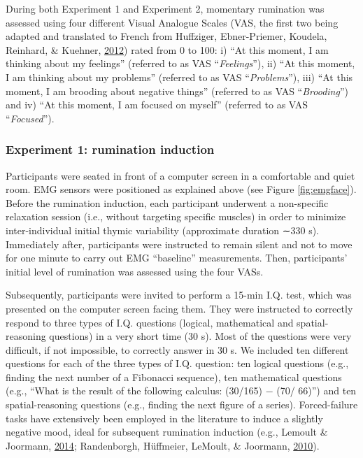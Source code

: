 \documentclass[a4paper,12pt,twoside,openright,oldfontcommands]{memoir}
\begin{document}
During both Experiment 1 and Experiment 2, momentary rumination was
assessed using four different Visual Analogue Scales (VAS, the first two
being adapted and translated to French from Huffziger, Ebner-Priemer,
Koudela, Reinhard, \& Kuehner,
\protect\hyperlink{ref-Huffziger2012}{2012}) rated from 0 to 100: i)
``At this moment, I am thinking about my feelings'' (referred to as VAS
``\emph{Feelings}''), ii) ``At this moment, I am thinking about my
problems'' (referred to as VAS ``\emph{Problems}''), iii) ``At this
moment, I am brooding about negative things'' (referred to as VAS
``\emph{Brooding}'') and iv) ``At this moment, I am focused on myself''
(referred to as VAS ``\emph{Focused}'').

\subsubsection{Experiment 1: rumination
induction}\label{experiment-1-rumination-induction}

Participants were seated in front of a computer screen in a comfortable
and quiet room. EMG sensors were positioned as explained above (see
Figure \ref{fig:emgface}). Before the rumination induction, each
participant underwent a non-specific relaxation session (i.e., without
targeting specific muscles) in order to minimize inter-individual
initial thymic variability (approximate duration ∼330 s). Immediately
after, participants were instructed to remain silent and not to move for
one minute to carry out EMG ``baseline'' measurements. Then,
participants' initial level of rumination was assessed using the four
VASs.

Subsequently, participants were invited to perform a 15-min I.Q. test,
which was presented on the computer screen facing them. They were
instructed to correctly respond to three types of I.Q. questions
(logical, mathematical and spatial-reasoning questions) in a very short
time (30 s). Most of the questions were very difficult, if not
impossible, to correctly answer in 30 s. We included ten different
questions for each of the three types of I.Q. question: ten logical
questions (e.g., finding the next number of a Fibonacci sequence), ten
mathematical questions (e.g., ``What is the result of the following
calculus: (30/165) − (70/ 66)'') and ten spatial-reasoning questions
(e.g., finding the next figure of a series). Forced-failure tasks have
extensively been employed in the literature to induce a slightly
negative mood, ideal for subsequent rumination induction (e.g., Lemoult
\& Joormann, \protect\hyperlink{ref-Lemoult2014}{2014}; Randenborgh,
Hüffmeier, LeMoult, \& Joormann,
\protect\hyperlink{ref-VanRandenborgh2010}{2010}).
\end{document}
